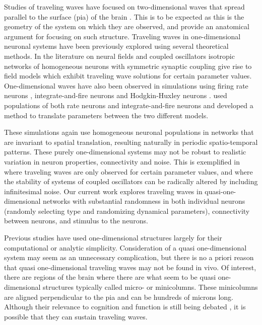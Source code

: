 \documentclass[12pt]{article}
\begin{document}
Studies of traveling waves have focused on two-dimensional waves that spread parallel to the surface (pia) of the brain \parencite{reimer2010}\parencite{keane2015}\parencite{Townsend2018}\parencite{Golomb1997}\parencite{Qi2015}. 
This is to be expected as this is the geometry of the system on which they are observed, and \parencite{Wilson1973} provide an anatomical argument for focusing on such structure. 
Traveling waves in one-dimensional neuronal systems have been previously explored using several theoretical methods.
In the literature on neural fields \parencite{Ermentrout1979}\parencite{Folias2012} and coupled oscillators \parencite{Kopell1986}\parencite{Williams1997} isotropic networks of homogeneous neurons with symmetric synaptic coupling give rise to field models which exhibit traveling wave solutions for certain parameter values. 
One-dimensional waves have also been observed in simulations using firing rate neurons \parencite{Roxin2005}, integrate-and-fire neurons \parencite{Bressloff1997}\parencite{Golomb1999} and Hodgkin-Huxley neurons \parencite{Golomb1997}.
\parencite{Senk2020} used populations of both rate neurons and integrate-and-fire neurons and developed a method to translate parameters between the two different models.

These simulations again use homogeneous neuronal populations in networks that are invariant to spatial translation, resulting naturally in periodic spatio-temporal patterns.
These purely one-dimensional systems may not be robust to realistic variation in neuron properties, connectivity and noise.
This is exemplified in \parencite{Senk2020} where traveling waves are only observed for certain parameter values, and \parencite{Strogatz1991} where the stability of systems of coupled oscillators can be radically altered by including infinitesimal noise.
Our current work explores traveling waves in quasi-one-dimensional networks with substantial randomness in both individual neurons (randomly selecting type and randomizing dynamical parameters), connectivity between neurons, and stimulus to the neurons.

Previous studies have used one-dimensional structures largely for their computational or analytic simplicity. 
Consideration of a quasi one-dimensional system may seem as an unnecessary complication, but there is no a priori reason that quasi one-dimensional traveling waves may not be found in vivo.
Of interest, there are regions of the brain where there are what seem to be quasi  one-dimensional structures \parencite{buxhoeveden2002}\parencite{mountcastle1997} typically called micro- or minicolumns. 
These minicolumns are aligned perpendicular to the pia and can be hundreds of microns long.  
Although their relevance to cognition and function is still being debated \parencite{horton2005}\parencite{Cruz2009}\parencite{buxhoeveden2002}, it is possible that they can sustain traveling waves.
\end{document}
